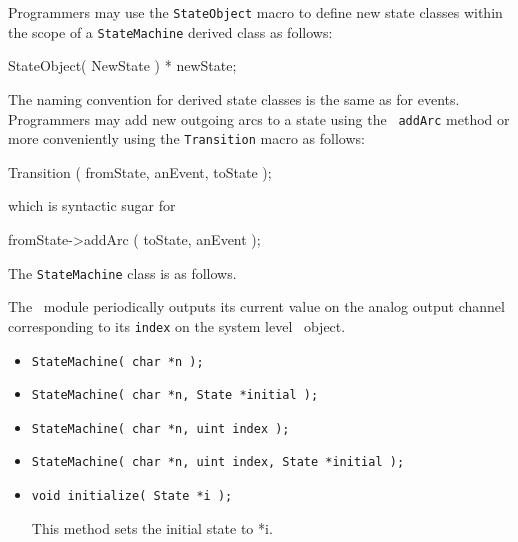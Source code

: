 \noindent Programmers may use the {\tt StateObject} macro to define new
state classes within the scope of a {\tt StateMachine} derived class as
follows:

\begin{codesegment}
  StateObject( NewState ) * newState;
\end{codesegment}

\noindent The naming convention for derived state classes is the same as for
events. Programmers may add new outgoing arcs to a state using the {\tt
addArc} method or more conveniently using the {\tt Transition} macro as
follows:

\begin{codesegment}
  Transition ( fromState, anEvent, toState );
\end{codesegment}

\noindent which is syntactic sugar for

\begin{codesegment}
  fromState->addArc ( toState, anEvent );
\end{codesegment}

The {\tt StateMachine} class is as follows.

\begin{moduleheader}
\classname{\StateMachine} \mline
\modulebase{\Module} \mline
{}
\end{moduleheader}

The \AnalogOutput\ module periodically outputs its current value on the
analog output channel corresponding to its { \tt index} on the system level
\Hardware\ object. \\

\constructors

\begin{itemize}
\item{\tt StateMachine( char *n );}
\item{\tt StateMachine( char *n, State *initial );}
\item{\tt StateMachine( char *n, uint index );}
\item{\tt StateMachine( char *n, uint index, State *initial );} 
\end{itemize}

\localinterface

\begin{itemize}
\item{\tt void initialize( State *i );} \par
This method sets the initial state to *i.
\end{itemize}

